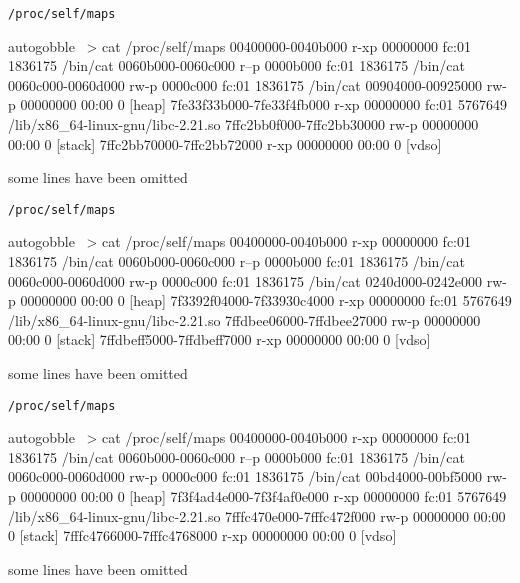 \documentclass[beamer]{uibk}
\begin{document}
\begin{frame}[fragile]{\texttt{/proc/self/maps}}
    \begin{pre*}{autogobble}
        ~> cat /proc/self/maps
        00400000-0040b000 r-xp 00000000 fc:01 1836175                            /bin/cat
        0060b000-0060c000 r--p 0000b000 fc:01 1836175                            /bin/cat
        0060c000-0060d000 rw-p 0000c000 fc:01 1836175                            /bin/cat
        00904000-00925000 rw-p 00000000 00:00 0                                  [heap]
        7fe33f33b000-7fe33f4fb000 r-xp 00000000 fc:01 5767649                    /lib/x86_64-linux-gnu/libc-2.21.so
        7ffc2bb0f000-7ffc2bb30000 rw-p 00000000 00:00 0                          [stack]
        7ffc2bb70000-7ffc2bb72000 r-xp 00000000 00:00 0                          [vdso]
    \end{pre*}
    \bigskip
    some lines have been omitted
\end{frame}
\begin{frame}[fragile]{\texttt{/proc/self/maps}}
    \begin{pre*}{autogobble}
        ~> cat /proc/self/maps
        00400000-0040b000 r-xp 00000000 fc:01 1836175                            /bin/cat
        0060b000-0060c000 r--p 0000b000 fc:01 1836175                            /bin/cat
        0060c000-0060d000 rw-p 0000c000 fc:01 1836175                            /bin/cat
        0240d000-0242e000 rw-p 00000000 00:00 0                                  [heap]
        7f3392f04000-7f33930c4000 r-xp 00000000 fc:01 5767649                    /lib/x86_64-linux-gnu/libc-2.21.so
        7ffdbee06000-7ffdbee27000 rw-p 00000000 00:00 0                          [stack]
        7ffdbeff5000-7ffdbeff7000 r-xp 00000000 00:00 0                          [vdso]
    \end{pre*}
    \bigskip
    some lines have been omitted
\end{frame}
\begin{frame}[fragile]{\texttt{/proc/self/maps}}
    \begin{pre*}{autogobble}
        ~> cat /proc/self/maps
        00400000-0040b000 r-xp 00000000 fc:01 1836175                            /bin/cat
        0060b000-0060c000 r--p 0000b000 fc:01 1836175                            /bin/cat
        0060c000-0060d000 rw-p 0000c000 fc:01 1836175                            /bin/cat
        00bd4000-00bf5000 rw-p 00000000 00:00 0                                  [heap]
        7f3f4ad4e000-7f3f4af0e000 r-xp 00000000 fc:01 5767649                    /lib/x86_64-linux-gnu/libc-2.21.so
        7fffc470e000-7fffc472f000 rw-p 00000000 00:00 0                          [stack]
        7fffc4766000-7fffc4768000 r-xp 00000000 00:00 0                          [vdso]
    \end{pre*}
    \bigskip
    some lines have been omitted
\end{frame}
\end{document}
